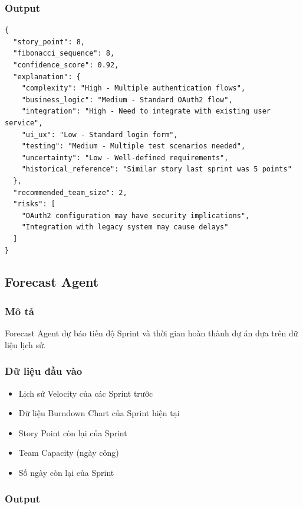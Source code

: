 \documentclass[12pt,a4paper]{report}
\begin{document}
\subsubsection{Output}

\begin{verbatim}
{
  "story_point": 8,
  "fibonacci_sequence": 8,
  "confidence_score": 0.92,
  "explanation": {
    "complexity": "High - Multiple authentication flows",
    "business_logic": "Medium - Standard OAuth2 flow",
    "integration": "High - Need to integrate with existing user service",
    "ui_ux": "Low - Standard login form",
    "testing": "Medium - Multiple test scenarios needed",
    "uncertainty": "Low - Well-defined requirements",
    "historical_reference": "Similar story last sprint was 5 points"
  },
  "recommended_team_size": 2,
  "risks": [
    "OAuth2 configuration may have security implications",
    "Integration with legacy system may cause delays"
  ]
}
\end{verbatim}

\subsection{Forecast Agent}

\subsubsection{Mô tả}

Forecast Agent dự báo tiến độ Sprint và thời gian hoàn thành dự án dựa trên dữ liệu lịch sử.

\subsubsection{Dữ liệu đầu vào}

\begin{itemize}
\item Lịch sử Velocity của các Sprint trước
\item Dữ liệu Burndown Chart của Sprint hiện tại
\item Story Point còn lại của Sprint
\item Team Capacity (ngày công)
\item Số ngày còn lại của Sprint
\end{itemize}

\subsubsection{Output}
\end{document}
